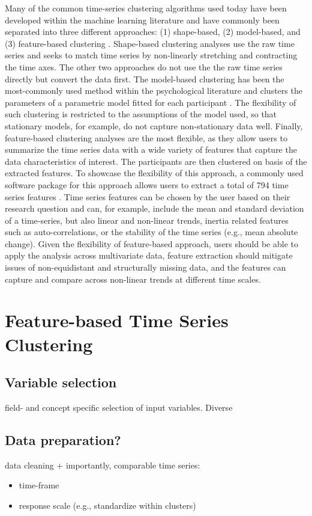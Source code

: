 \documentclass[man, 12pt, a4paper]{apa7}
\theoremstyle{break}
\theoremstyle{plain}
\begin{document}
Many of the common time-series clustering algorithms used today have been developed within the machine learning literature and have commonly been separated into three different approaches: (1) shape-based, (2) model-based, and (3) feature-based clustering \citep{hautamaki2008, liao2005}. Shape-based clustering analyses use the raw time series and seeks to match time series by non-linearly stretching and contracting the time axes. The other two approaches do not use the the raw time series directly but convert the data first. The model-based clustering has been the most-commonly used method within the psychological literature and clusters the parameters of a parametric model fitted for each participant \citep[e.g.,][]{ernst2021}. The flexibility of such clustering is restricted to the assumptions of the model used, so that stationary models, for example, do not capture non-stationary data well. Finally, feature-based clustering analyses are the most flexible, as they allow users to summarize the time series data with a wide variety of features that capture the data characteristics of interest. The participants are then clustered on basis of the extracted features. To showcase the flexibility of this approach, a commonly used software package for this approach allows users to extract a total of 794 time series features \citep[][]{christ2018}. Time series features can be chosen by the user based on their research question and can, for example, include the mean and standard deviation of a time-series, but also linear and non-linear trends, inertia related features such as auto-correlations, or the stability of the time series (e.g., mean absolute change). Given the flexibility of feature-based approach, users should be able to apply the analysis across multivariate data, feature extraction should mitigate issues of non-equidistant and structurally missing data, and the features can capture and compare across non-linear trends at different time scales.

\section{Feature-based Time Series Clustering}

\subsection{Variable selection}
field- and concept specific selection of input variables. Diverse 

\subsection{Data preparation?}
data cleaning + importantly, comparable time series:
\begin{itemize}[noitemsep]
    \item time-frame
    \item response scale (e.g., standardize within clusters)
\end{itemize}
\end{document}

